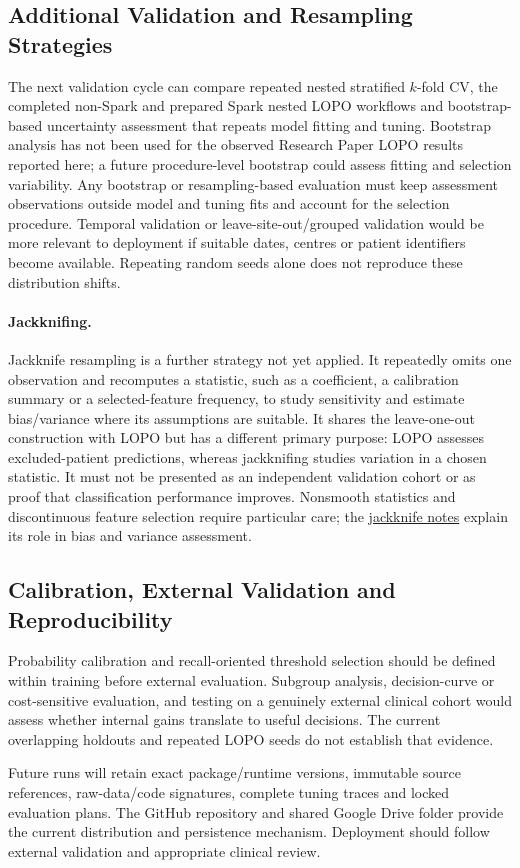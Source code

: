 \subsection{Additional Validation and Resampling Strategies}
The next validation cycle can compare repeated nested stratified $k$-fold CV, the completed non-Spark and prepared Spark nested LOPO workflows and bootstrap-based uncertainty assessment that repeats model fitting and tuning. Bootstrap analysis has not been used for the observed Research Paper LOPO results reported here; a future procedure-level bootstrap could assess fitting and selection variability. Any bootstrap or resampling-based evaluation must keep assessment observations outside model and tuning fits and account for the selection procedure. Temporal validation or leave-site-out/grouped validation would be more relevant to deployment if suitable dates, centres or patient identifiers become available. Repeating random seeds alone does not reproduce these distribution shifts.

\paragraph{Jackknifing.} Jackknife resampling is a further strategy not yet applied. It repeatedly omits one observation and recomputes a statistic, such as a coefficient, a calibration summary or a selected-feature frequency, to study sensitivity and estimate bias/variance where its assumptions are suitable. It shares the leave-one-out construction with LOPO but has a different primary purpose: LOPO assesses excluded-patient predictions, whereas jackknifing studies variation in a chosen statistic. It must not be presented as an independent validation cohort or as proof that classification performance improves. Nonsmooth statistics and discontinuous feature selection require particular care; the \href{https://www.stat.cmu.edu/~cshalizi/490/23/2023-11-29-jackknife.pdf}{jackknife notes} explain its role in bias and variance assessment.

\subsection{Calibration, External Validation and Reproducibility}
Probability calibration and recall-oriented threshold selection should be defined within training before external evaluation. Subgroup analysis, decision-curve or cost-sensitive evaluation, and testing on a genuinely external clinical cohort would assess whether internal gains translate to useful decisions. The current overlapping holdouts and repeated LOPO seeds do not establish that evidence.

Future runs will retain exact package/runtime versions, immutable source references, raw-data/code signatures, complete tuning traces and locked evaluation plans. The GitHub repository and shared Google Drive folder provide the current distribution and persistence mechanism. Deployment should follow external validation and appropriate clinical review.
